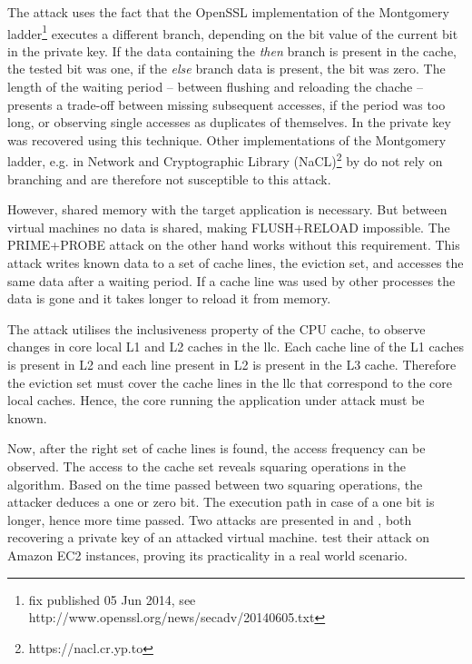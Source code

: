The attack uses the fact that the OpenSSL implementation of the Montgomery
ladder\footnote{fix published 05 Jun 2014, see
http://www.openssl.org/news/secadv/20140605.txt}
executes a different branch, depending on the bit value of the current
bit in the private key.
If the data containing the \textit{then} branch is present in the cache, the
tested bit was one, if the \textit{else} branch data is present, the bit was
zero.
The length of the waiting period -- between flushing and reloading the chache
-- presents a trade-off between missing subsequent accesses, if the period was
too long, or observing single accesses as duplicates of themselves.
In \cite{yarom_recovering_2014} the private key was recovered using this
technique.
Other implementations of the Montgomery ladder, e.g. in Network and
Cryptographic Library (NaCL)\footnote{https://nacl.cr.yp.to} by
\citeauthor{bernstein_security_2012}
do not rely on branching and are therefore not susceptible to this attack.

However, shared memory with the target application is necessary.
But between virtual machines no data is shared, making FLUSH+RELOAD
impossible.
The PRIME+PROBE attack on the other hand works without this requirement.
This attack writes known data to a set of cache lines, the eviction set,
and accesses the same data after a waiting period.
If a cache line was used by other processes the data is gone and it takes
longer to reload it from memory.

The attack utilises the inclusiveness property of the CPU cache, to observe
changes in core local L1 and L2 caches in the \gls{llc}.
Each cache line of the L1 caches is present in L2 and each line present in L2
is present in the L3 cache.
Therefore the eviction set must cover the cache lines in the \gls{llc} that
correspond to the core local caches.
Hence, the core running the application under attack must be known.

Now, after the right set of cache lines is found, the access frequency can be
observed.
The access to the cache set reveals squaring operations in the algorithm.
Based on the time passed between two squaring operations, the attacker deduces
a one or zero bit.
The execution path in case of a one bit is longer, hence more time passed.
Two attacks are presented in \cite{liu_last-level_2015} and
\cite{inci_seriously_2015}, both recovering a private key of an attacked
virtual machine.
\citeauthor{inci_seriously_2015} test their attack on Amazon EC2 instances,
proving its practicality in a real world scenario.

